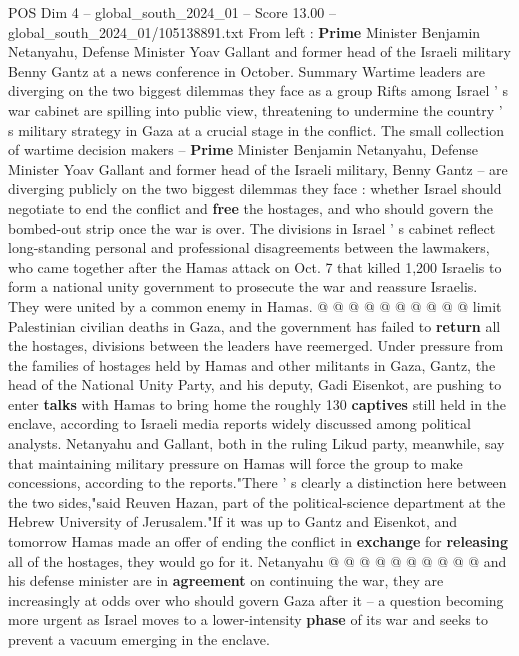 \begin{textsample}{POS Dim 4 – global\_south\_2024\_01 – Score 13.00 – global\_south\_2024\_01/105138891.txt}  \label{ex:f4_pos_380}
From left : \textbf{Prime} Minister Benjamin Netanyahu, Defense Minister Yoav Gallant and former head of the Israeli military Benny Gantz at a news conference in October.
Summary Wartime leaders are diverging on the two biggest dilemmas they face as a group Rifts among Israel ' s war cabinet are spilling into public view, threatening to undermine the country ' s military strategy in Gaza at a crucial stage in the conflict.
The small collection of wartime decision makers -- \textbf{Prime} Minister Benjamin Netanyahu, Defense Minister Yoav Gallant and former head of the Israeli military, Benny Gantz -- are diverging publicly on the two biggest dilemmas they face : whether Israel should negotiate to end the conflict and \textbf{free} the hostages, and who should govern the bombed-out strip once the war is over.
The divisions in Israel ' s cabinet reflect long-standing personal and professional disagreements between the lawmakers, who came together after the Hamas attack on Oct. 7 that killed 1,200 Israelis to form a national unity government to prosecute the war and reassure Israelis.
They were united by a common enemy in Hamas. @ @ @ @ @ @ @ @ @ @ limit Palestinian civilian deaths in Gaza, and the government has failed to \textbf{return} all the hostages, divisions between the leaders have reemerged.
Under pressure from the families of hostages held by Hamas and other militants in Gaza, Gantz, the head of the National Unity Party, and his deputy, Gadi Eisenkot, are pushing to enter \textbf{talks} with Hamas to bring home the roughly 130 \textbf{captives} still held in the enclave, according to Israeli media reports widely discussed among political analysts.
Netanyahu and Gallant, both in the ruling Likud party, meanwhile, say that maintaining military pressure on Hamas will force the group to make concessions, according to the reports."There ' s clearly a distinction here between the two sides,"said Reuven Hazan, part of the political-science department at the Hebrew University of Jerusalem."If it was up to Gantz and Eisenkot, and tomorrow Hamas made an offer of ending the conflict in \textbf{exchange} for \textbf{releasing} all of the hostages, they would go for it.
Netanyahu @ @ @ @ @ @ @ @ @ @ and his defense minister are in \textbf{agreement} on continuing the war, they are increasingly at odds over who should govern Gaza after it -- a question becoming more urgent as Israel moves to a lower-intensity \textbf{phase} of its war and seeks to prevent a vacuum emerging in the enclave.

\end{textsample}
